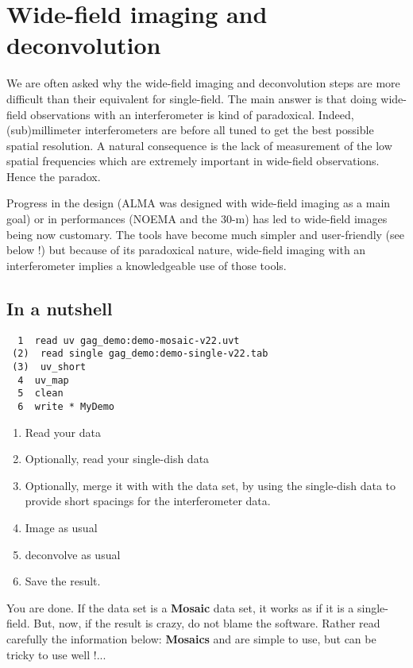 
\section{Wide-field imaging and deconvolution}

We are often asked why the wide-field imaging and deconvolution steps are
more difficult than their equivalent for single-field. The main answer is
that doing wide-field observations with an interferometer is kind of
paradoxical. Indeed, (sub)millimeter interferometers are before all tuned
to get the best possible spatial resolution. A natural consequence is the
lack of measurement of the low spatial frequencies which are extremely
important in wide-field observations. Hence the paradox.  

Progress in the design (ALMA was designed with wide-field imaging as a 
main goal) or in performances (NOEMA and the 30-m) has led to 
wide-field images being now customary.  The tools have become much 
simpler and user-friendly (see below !) but because of its paradoxical 
nature, wide-field imaging with an interferometer implies a 
knowledgeable use of those tools.

\subsection{In a nutshell}

\begin{verbatim}
  1  read uv gag_demo:demo-mosaic-v22.uvt
 (2)  read single gag_demo:demo-single-v22.tab
 (3)  uv_short
  4  uv_map
  5  clean
  6  write * MyDemo
\end{verbatim}
\begin{enumerate}\itemsep 0pt
\item Read your \uv{} data
\item Optionally, read your single-dish data
\item Optionally, merge it with with the \uv{} data set,
by using the single-dish data to provide short spacings
for the interferometer data.
\item Image as usual
\item deconvolve as usual
\item Save the result.
\end{enumerate}
You are done. If the \uv{} data set is a \textbf{Mosaic} data set,
it works as if it is a single-field. But, now, if the result is crazy, do not blame the
software. Rather read carefully the information below: \textbf{Mosaics} and
 are simple to use, but can be tricky to use well !...

